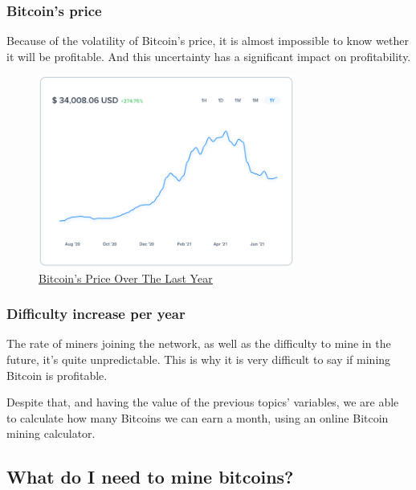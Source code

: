 \documentclass{article}
\newcommand\tab[1][1cm]{\hspace*{#1}}
\begin{document}
\newpage

\subsubsection{Bitcoin's price}

\tab Because of the volatility of Bitcoin's price, it is almost impossible to know wether it will be profitable. And this uncertainty has a significant impact on profitability.

\begin{figure}[H]
    \begin{center}
        \includegraphics[width=0.75\textwidth]{images/bitcoin_price.png}
        \caption{\href{https://uphold.com/en/prices/crypto/bitcoin-price}{\underline{Bitcoin's Price Over The Last Year}}}
    \end{center}
\end{figure}

\subsubsection{Difficulty increase per year}

\tab The rate of miners joining the network, as well as the difficulty to mine in the future, it's quite unpredictable. This is why it is very difficult to say if mining Bitcoin is profitable.

Despite that, and having the value of the previous topics' variables, we are able to calculate how many Bitcoins we can earn a month, using an online Bitcoin mining calculator.

\subsection{What do I need to mine bitcoins?}
\end{document}
